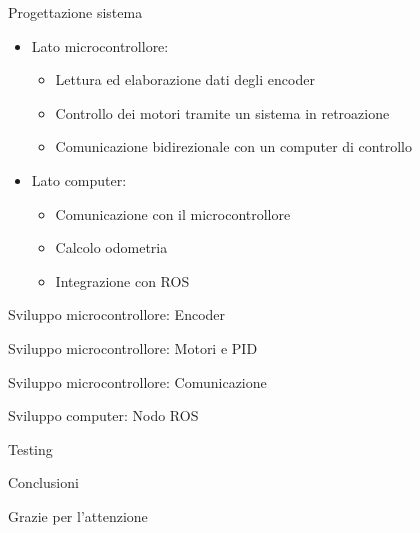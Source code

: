 \documentclass{beamer}
\begin{document}
\begin{tframe}{Progettazione sistema}
\begin{itemize}
\item Lato microcontrollore:
\begin{itemize}
    \item Lettura ed elaborazione dati degli encoder
    \item Controllo dei motori tramite un sistema in retroazione
    \item Comunicazione bidirezionale con un computer di controllo
\end{itemize}
\item Lato computer:
 \begin{itemize}
    \item Comunicazione con il microcontrollore
    \item Calcolo odometria
    \item Integrazione con ROS
\end{itemize}
\end{itemize}

\end{tframe}

\begin{tframe}{Sviluppo microcontrollore: Encoder}

\end{tframe}

\begin{tframe}{Sviluppo microcontrollore: Motori e PID}

\end{tframe}

\begin{tframe}{Sviluppo microcontrollore: Comunicazione}

\end{tframe}

\begin{tframe}{Sviluppo computer: Nodo ROS}

\end{tframe}

\begin{tframe}{Testing}

\end{tframe}

\begin{tframe}{Conclusioni}

\end{tframe}

\begin{tframe}{Grazie per l'attenzione}

\end{tframe}
\end{document}
